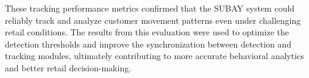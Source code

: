 {These tracking performance metrics confirmed that the SUBAY system could reliably track and analyze customer movement patterns even under challenging retail conditions. The results from this evaluation were used to optimize the detection thresholds and improve the synchronization between detection and tracking modules, ultimately contributing to more accurate behavioral analytics and better retail decision-making.

}